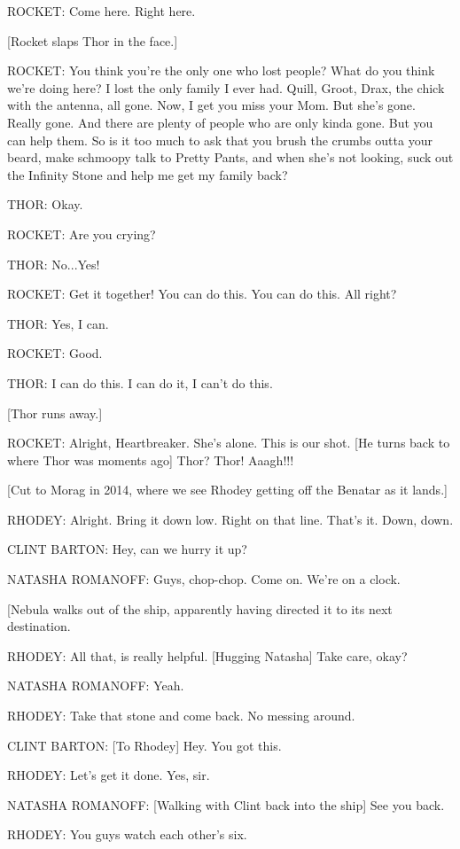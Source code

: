ROCKET: Come here. Right here.

[Rocket slaps Thor in the face.]

ROCKET: You think you're the only one who lost people? What do you think we're doing here? I lost the only family I ever had. Quill, Groot, Drax, the chick with the antenna, all gone. Now, I get you miss your Mom. But she's gone. Really gone. And there are plenty of people who are only kinda gone. But you can help them. So is it too much to ask that you brush the crumbs outta your beard, make schmoopy talk to Pretty Pants, and when she's not looking, suck out the Infinity Stone and help me get my family back?

THOR: Okay.

ROCKET: Are you crying?

THOR: No...Yes!

ROCKET: Get it together! You can do this. You can do this. All right?

THOR: Yes, I can.

ROCKET: Good.

THOR: I can do this. I can do it, I can't do this.

[Thor runs away.]

ROCKET: Alright, Heartbreaker. She's alone. This is our shot. [He turns back to where Thor was moments ago] Thor? Thor! Aaagh!!!

[Cut to Morag in 2014, where we see Rhodey getting off the Benatar as it lands.]

RHODEY: Alright. Bring it down low. Right on that line. That's it. Down, down.

CLINT BARTON: Hey, can we hurry it up?

NATASHA ROMANOFF: Guys, chop-chop. Come on. We're on a clock.

[Nebula walks out of the ship, apparently having directed it to its next destination.

RHODEY: All that, is really helpful. [Hugging Natasha] Take care, okay?

NATASHA ROMANOFF: Yeah.

RHODEY: Take that stone and come back. No messing around.

CLINT BARTON: [To Rhodey] Hey. You got this.

RHODEY: Let's get it done. Yes, sir.

NATASHA ROMANOFF: [Walking with Clint back into the ship] See you back.

RHODEY: You guys watch each other's six.

